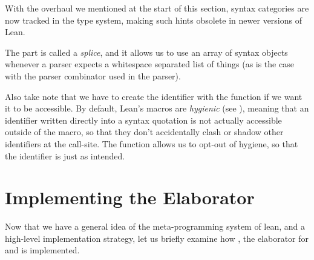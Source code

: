 \begin{remark}
    With the overhaul we mentioned at the start of this section, syntax categories are now tracked in the 
    type system, making such hints obsolete in newer versions of Lean.
\end{remark}

The \lean{\$[...]*} part is called a \emph{splice}, and it allows us to use an array of syntax objects whenever a parser expects a whitespace separated list of things (as is the case with the  parser combinator used in the \inductive{} parser).

Also take note that we have to create the identifier  with the  function if
we want it to be accessible. By default, Lean's macros are \emph{hygienic} (see \cite{ullrichNotationsHygienicMacro2022}),
meaning that an identifier  written directly into a syntax quotation is not actually accessible outside of the macro, so that they don't accidentally clash or shadow other identifiers at the call-site. The  function allows us to opt-out of hygiene, so that the identifier is just  as intended.






\section{Implementing the Elaborator}
\label{sec:implementing}

Now that we have a general idea of the meta-programming system of lean, and a high-level implementation strategy, let us 
briefly examine how , the elaborator for \data{} and \codata{} is implemented.



